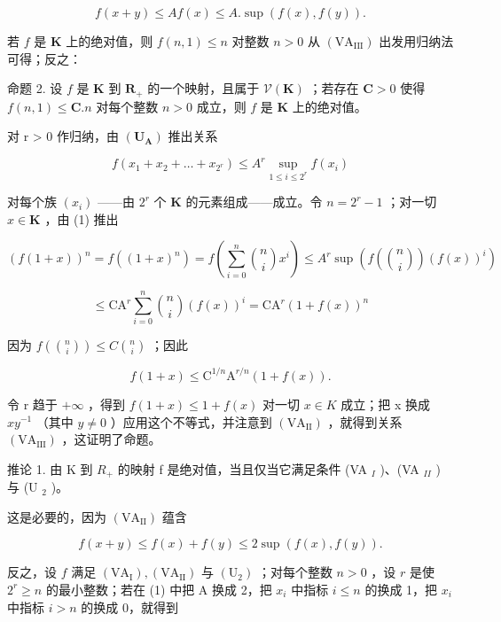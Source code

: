 \[
f (x + y) \leqslant A f (x) \leqslant A. \sup (f (x), f (y)).
\]

若 \(f\) 是 \(\mathbf{K}\) 上的绝对值，则 \(f(n,1) \leqslant n\) 对整数 \(n > 0\) 从 \((\mathrm{VA}_{\mathrm{III}})\) 出发用归纳法可得；反之：

命题 2. 设 \(f\) 是 \(\mathbf{K}\) 到 \(\mathbf{R}_+\) 的一个映射，且属于 \(\mathcal{V}(\mathbf{K})\) ；若存在 \(\mathbf{C} > 0\) 使得 \(f(n,1) \leqslant \mathbf{C}.n\) 对每个整数 \(n > 0\) 成立，则 \(f\) 是 \(\mathbf{K}\) 上的绝对值。

对 r > 0 作归纳，由 \((\mathbf{U}_{\mathbf{A}})\) 推出关系

\[
f (x _ {1} + x _ {2} + \dots + x _ {2 ^ {r}}) \leqslant A ^ {r} \sup _ {1 \leqslant i \leqslant 2 ^ {r}} f (x _ {i})\tag{1}
\]

对每个族 \((x_{i})\) ——由 \(2^{r}\) 个 \(\mathbf{K}\) 的元素组成——成立。令 \(n = 2^{r} - 1\) ；对一切 \(x \in \mathbf{K}\) ，由 (1) 推出

\[
(f (1 + x)) ^ {n} = f ((1 + x) ^ {n}) = f \left(\sum_ {i = 0} ^ {n} \binom {n} {i} x ^ {i}\right) \leqslant A ^ {r} \sup \left(f \left(\binom {n} {i}\right) (f (x)) ^ {i}\right)
\]

\[
\leqslant \mathrm{CA} ^ {r} \sum_ {i = 0} ^ {n} \binom {n} {i} (f (x)) ^ {i} = \mathrm{CA} ^ {r} (1 + f (x)) ^ {n}
\]

因为 \(f\left(\binom{n}{i}\right) \leqslant C\binom{n}{i}\) ；因此

\[
f (1 + x) \leqslant \mathrm{C} ^ {1 / n} \mathrm{A} ^ {r / n} (1 + f (x)).
\]

令 r 趋于 \(+\infty\) ，得到 \(f(1+x)\leqslant1+f(x)\) 对一切 \(x\in K\) 成立；把 x 换成 \(xy^{-1}\) （其中 \(y\neq0\) ）应用这个不等式，并注意到 \((\mathrm{VA}_{\mathrm{II}})\) ，就得到关系 \((\mathrm{VA}_{\mathrm{III}})\) ，这证明了命题。

推论 1. 由 K 到 \(R_{+}\) 的映射 f 是绝对值，当且仅当它满足条件 (VA \(_{I}\) )、(VA \(_{II}\) ) 与 (U \(_{2}\) )。

这是必要的，因为 \((\mathrm{VA}_{\mathrm{II}})\) 蕴含

\[
f (x + y) \leqslant f (x) + f (y) \leqslant 2 \sup (f (x), f (y)).
\]

反之，设 \(f\) 满足 \((\mathrm{VA}_{\mathrm{I}}), (\mathrm{VA}_{\mathrm{II}})\) 与 \((\mathrm{U}_2)\) ；对每个整数 \(n > 0\) ，设 \(r\) 是使 \(2^r \geqslant n\) 的最小整数；若在 (1) 中把 A 换成 2，把 \(x_i\) 中指标 \(i \leqslant n\) 的换成 1，把 \(x_i\) 中指标 \(i > n\) 的换成 0，就得到

